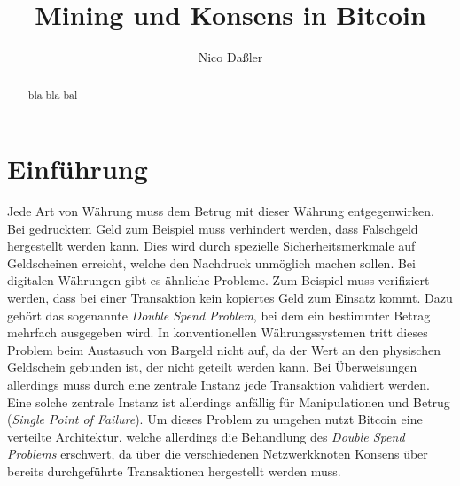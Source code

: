 \documentclass[ngerman,runningheads,a4paper]{llncs}[2018/03/10]
\begin{document}
\title{Mining und Konsens in Bitcoin}

\author{Nico Daßler}

%
%

\maketitle

\begin{abstract}
bla bla bal
\end{abstract}



\section{Einführung}\label{sec:einführung}

Jede Art von Währung muss dem Betrug mit dieser Währung entgegenwirken. Bei gedrucktem Geld zum Beispiel muss verhindert werden, dass Falschgeld hergestellt werden kann. Dies wird durch spezielle Sicherheitsmerkmale auf Geldscheinen erreicht, welche den Nachdruck unmöglich machen sollen. Bei digitalen Währungen gibt es ähnliche Probleme. Zum Beispiel muss verifiziert werden, dass bei einer Transaktion kein kopiertes Geld zum Einsatz kommt. Dazu gehört das sogenannte \textit{Double Spend Problem}, bei dem ein bestimmter Betrag mehrfach ausgegeben wird. In konventionellen Währungssystemen tritt dieses Problem beim Austasuch von Bargeld nicht auf, da der Wert an den physischen Geldschein gebunden ist, der nicht geteilt werden kann. Bei Überweisungen allerdings muss durch eine zentrale Instanz jede Transaktion validiert werden. Eine solche zentrale Instanz ist allerdings anfällig für Manipulationen und Betrug (\textit{Single Point of Failure}). Um dieses Problem zu umgehen nutzt Bitcoin eine verteilte Architektur. welche allerdings die Behandlung des \textit{Double Spend Problems} erschwert, da über die verschiedenen Netzwerkknoten Konsens über bereits durchgeführte Transaktionen hergestellt werden muss. 
\end{document}
